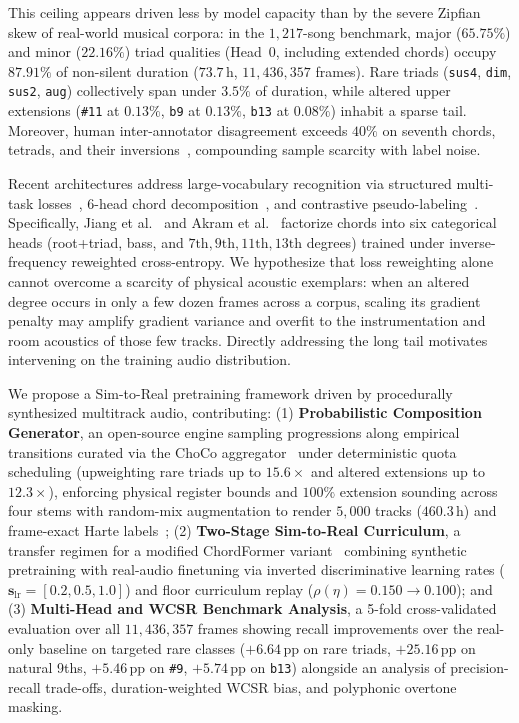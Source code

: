 \documentclass{article}
\begin{document}
This ceiling appears driven less by model capacity than by the severe Zipfian skew of real-world musical corpora: in the $1{,}217$-song benchmark, major ($65.75\%$) and minor ($22.16\%$) triad qualities (Head~0, including extended chords) occupy $87.91\%$ of non-silent duration ($73.7\,\text{h}$, $11{,}436{,}357$ frames). Rare triads ({\small\texttt{sus4}}, {\small\texttt{dim}}, {\small\texttt{sus2}}, {\small\texttt{aug}}) collectively span under $3.5\%$ of duration, while altered upper extensions ({\small\texttt{\#11}} at $0.13\%$, {\small\texttt{b9}} at $0.13\%$, {\small\texttt{b13}} at $0.08\%$) inhabit a sparse tail. Moreover, human inter-annotator disagreement exceeds $40\%$ on seventh chords, tetrads, and their inversions~\cite{koops2019annotator}, compounding sample scarcity with label noise.

Recent architectures address large-vocabulary recognition via structured multi-task losses~\cite{mcfee2017structured}, 6-head chord decomposition~\cite{jiang2019large,akram2026chordformer}, and contrastive pseudo-labeling~\cite{li2025large}. Specifically, Jiang et al.~\cite{jiang2019large} and Akram et al.~\cite{akram2026chordformer} factorize chords into six categorical heads (root+triad, bass, and $7\text{th}, 9\text{th}, 11\text{th}, 13\text{th}$ degrees) trained under inverse-frequency reweighted cross-entropy. We hypothesize that loss reweighting alone cannot overcome a scarcity of physical acoustic exemplars: when an altered degree occurs in only a few dozen frames across a corpus, scaling its gradient penalty may amplify gradient variance and overfit to the instrumentation and room acoustics of those few tracks. Directly addressing the long tail motivates intervening on the training audio distribution.

We propose a Sim-to-Real pretraining framework driven by procedurally synthesized multitrack audio, contributing: (1) \textbf{Probabilistic Composition Generator}, an open-source engine sampling progressions along empirical transitions curated via the ChoCo aggregator~\cite{deberardinis2023choco} under deterministic quota scheduling (upweighting rare triads up to $15.6\times$ and altered extensions up to $12.3\times$), enforcing physical register bounds and $100\%$ extension sounding across four stems with random-mix augmentation to render $5{,}000$ tracks ($460.3\,\text{h}$) and frame-exact Harte labels~\cite{harte2005symbolic}; (2) \textbf{Two-Stage Sim-to-Real Curriculum}, a transfer regimen for a modified ChordFormer variant~\cite{akram2026chordformer} combining synthetic pretraining with real-audio finetuning via inverted discriminative learning rates ($\mathbf{s}_{\text{lr}} = [0.2, 0.5, 1.0]$) and floor curriculum replay ($\rho(\eta) = 0.150 \!\to\! 0.100$); and (3) \textbf{Multi-Head and WCSR Benchmark Analysis}, a 5-fold cross-validated evaluation over all $11{,}436{,}357$ frames showing recall improvements over the real-only baseline on targeted rare classes ($+6.64\,\text{pp}$ on rare triads, $+25.16\,\text{pp}$ on natural 9ths, $+5.46\,\text{pp}$ on {\small\texttt{\#9}}, $+5.74\,\text{pp}$ on {\small\texttt{b13}}) alongside an analysis of precision-recall trade-offs, duration-weighted WCSR bias, and polyphonic overtone masking.
\end{document}
